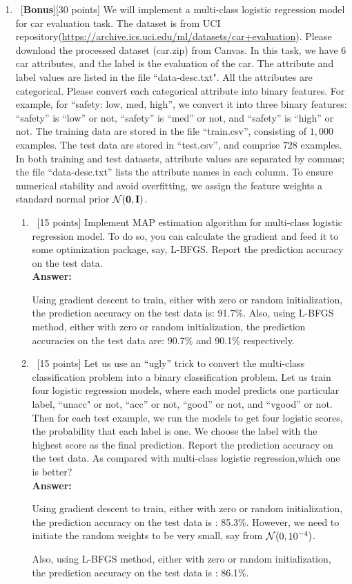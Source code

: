\documentclass[12pt, fullpage,letterpaper]{article}
\def\red{\color{red}}
\def\blackblue{\color{black!40!blue}}
\begin{document}
\begin{enumerate}
	
	\item~[\textbf{Bonus}][30 points]  We will implement a multi-class logistic regression model for car evaluation task. The dataset is from UCI repository(\url{https://archive.ics.uci.edu/ml/datasets/car+evaluation}). Please download the processed dataset (car.zip) from Canvas.  In this task, we have $6$ car attributes, and the label is the evaluation of the car. The attribute and label values are listed in the file ``data-desc.txt". All the attributes are categorical. Please convert each categorical attribute into binary features. For example, for ``safety: low, med, high'', we convert it into three binary features: ``safety'' is ``low'' or not, ``safety'' is ``med'' or not, and ``safety'' is  ``high'' or not. 
	The training data are stored in the file ``train.csv'', consisting of $1,000$ examples. The test data are stored in ``test.csv'', and comprise $728$ examples. In both training and test datasets, attribute values are separated by commas; the file ``data-desc.txt''  lists the attribute names in each column.  To ensure numerical stability and avoid overfitting, we assign the feature weights a standard normal prior $\mathcal{N}({\bf 0}, {\bf I})$.  
	\begin{enumerate}
		\item~[15 points] Implement MAP estimation algorithm for multi-class logistic regression model. To do so, you can calculate the gradient and feed it to some optimization package, say, L-BFGS. Report the prediction accuracy on the test data. \\
	{\bf \red Answer:} {\blackblue 
	Using gradient descent to train, either with zero or random initialization, the prediction accuracy on the test data is: 91.7\%. 
	Also, using L-BFGS method, either with zero or random initialization, the prediction accuracies on the test data are: 90.7\% and 90.1\% respectively.
	
	}
		\item~[15 points] Let us use an ``ugly'' trick to convert the multi-class classification problem into a binary classification problem.
		Let us train four logistic regression models, where each model predicts one particular label, \ie ``unacc" or not, ``acc'' or not, ``good'' or not, 
		and ``vgood'' or not. Then for each test example, we run the models to get four logistic scores, \ie the probability that each label is one. 
		We choose the label with the highest score as the final prediction. Report the prediction accuracy on the test data. 
		As compared with multi-class logistic regression,which one is better? \\
	{\bf \red Answer:} {\blackblue 
	Using gradient descent to train, either with zero or random initialization, the prediction accuracy on the test data is : 85.3\%. 
	However, we need to initiate the random weights to be very small, say from $\mathcal{N}(0,10^{-4})$.
	
	Also, using L-BFGS method, either with zero or random initialization, the prediction accuracy on the test data is : 86.1\%.
	} 
	\end{enumerate}
	
	
	

	
\end{enumerate}
\end{document}
